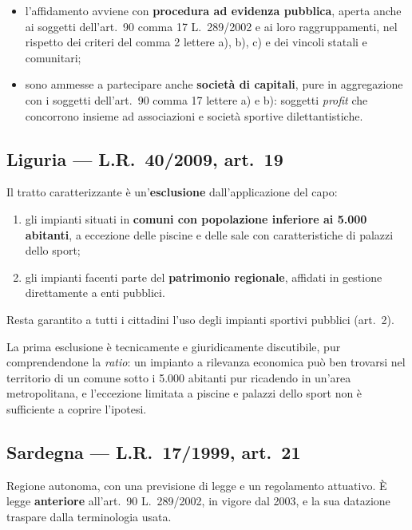 
\begin{itemize}
  \item l'affidamento avviene con \textbf{procedura ad evidenza pubblica}, aperta anche ai soggetti
    dell'art.\ 90 comma 17 L.\ 289/2002 e ai loro raggruppamenti, nel rispetto dei criteri del
    comma 2 lettere a), b), c) e dei vincoli statali e comunitari;
  \item sono ammesse a partecipare anche \textbf{società di capitali}, pure in aggregazione con i
    soggetti dell'art.\ 90 comma 17 lettere a) e b): soggetti \textit{profit} che concorrono
    insieme ad associazioni e società sportive dilettantistiche.
\end{itemize}

\subsection{Liguria --- L.R.\ 40/2009, art.\ 19}

Il tratto caratterizzante è un'\textbf{esclusione} dall'applicazione del capo:

\begin{enumerate}
  \item[a)] gli impianti situati in \textbf{comuni con popolazione inferiore ai 5.000 abitanti}, a
    eccezione delle piscine e delle sale con caratteristiche di palazzi dello sport;
  \item[b)] gli impianti facenti parte del \textbf{patrimonio regionale}, affidati in gestione
    direttamente a enti pubblici.
\end{enumerate}

Resta garantito a tutti i cittadini l'uso degli impianti sportivi pubblici (art.\ 2).

La prima esclusione è tecnicamente e giuridicamente discutibile, pur comprendendone la
\textit{ratio}: un impianto a rilevanza economica può ben trovarsi nel territorio di un comune
sotto i 5.000 abitanti pur ricadendo in un'area metropolitana, e l'eccezione limitata a piscine e
palazzi dello sport non è sufficiente a coprire l'ipotesi.

\subsection{Sardegna --- L.R.\ 17/1999, art.\ 21}

Regione autonoma, con una previsione di legge e un regolamento attuativo. È legge
\textbf{anteriore} all'art.\ 90 L.\ 289/2002, in vigore dal 2003, e la sua datazione traspare
dalla terminologia usata.

